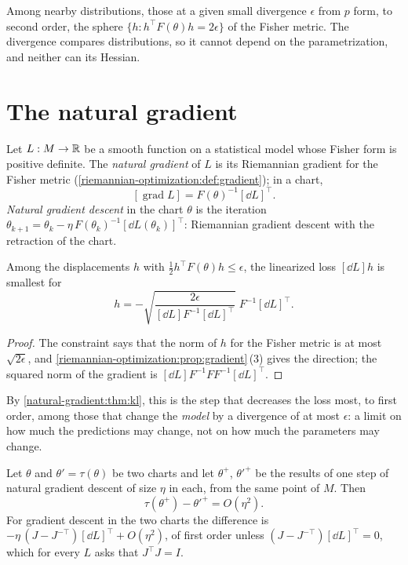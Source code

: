 \begin{notechapter}
\begin{keyidea}
Among nearby distributions, those at a given small divergence
$\epsilon$ from $p$ form, to second order, the sphere
$\{h : h^\top F(\theta)h = 2\epsilon\}$ of the Fisher metric. The
divergence compares distributions, so it cannot depend on the
parametrization, and neither can its Hessian.
\end{keyidea}

\section{The natural gradient}\label{natural-gradient:sec:ngd}

\begin{definition}\label{natural-gradient:def:natural}
Let $L:M\to\mathbb{R}$ be a smooth function on a statistical model whose Fisher
form is positive definite. The \emph{natural gradient} of $L$ is its
Riemannian gradient for the Fisher metric
(\cref{riemannian-optimization:def:gradient}); in a chart,
\[
  [\operatorname{grad}L] = F(\theta)^{-1}[\dd L]^\top .
\]
\emph{Natural gradient descent} in the chart $\theta$ is the iteration
$\theta_{k+1} = \theta_k - \eta\,F(\theta_k)^{-1}[\dd L(\theta_k)]^\top$:
Riemannian gradient descent with the retraction of the chart.
\end{definition}

\begin{proposition}
\label{natural-gradient:prop:steepest}
Among the displacements $h$ with $\frac12h^\top F(\theta)h\leq\epsilon$,
the linearized loss $[\dd L]h$ is smallest for
\[
  h = -\sqrt{\frac{2\epsilon}{[\dd L]F^{-1}[\dd L]^\top}}\;
      F^{-1}[\dd L]^\top .
\]
\end{proposition}

\begin{proof}
The constraint says that the norm of $h$ for the Fisher metric is at most
$\sqrt{2\epsilon}$, and
\cref{riemannian-optimization:prop:gradient}\,(3) gives the direction;
the squared norm of the gradient is
$[\dd L]F^{-1}FF^{-1}[\dd L]^\top$.
\end{proof}

By \cref{natural-gradient:thm:kl}, this is the step that decreases the
loss most, to first order, among those that change the \emph{model} by a
divergence of at most $\epsilon$: a limit on how much the predictions
may change, not on how much the parameters may change.

\begin{theorem}
\label{natural-gradient:thm:invariance}
Let $\theta$ and $\theta' = \tau(\theta)$ be two charts and let
$\theta^+$, $\theta'^+$ be the results of one step of natural gradient
descent of size $\eta$ in each, from the same point of $M$. Then
\[
  \tau(\theta^+) - \theta'^+ = O(\eta^2) .
\]
For gradient descent in the two charts the difference is
$-\eta\,(J - J^{-\top})[\dd L]^\top + O(\eta^2)$, of first order unless
$(J - J^{-\top})[\dd L]^\top = 0$, which for every $L$ asks that
$J^\top J = I$.
\end{theorem}


\end{notechapter}

